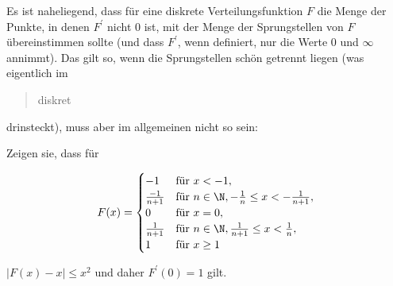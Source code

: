 
\begin{exercise}

Es ist naheliegend, dass für eine diskrete Verteilungsfunktion $F$ die Menge der Punkte, in denen $F^\prime$ nicht $0$ ist, mit der Menge der Sprungstellen von $F$ übereinstimmen sollte (und dass $F^\prime$, wenn definiert, nur die Werte $0$ und $\infty$ annimmt).
Das gilt so, wenn die Sprungstellen schön getrennt liegen (was eigentlich im \blockquote{diskret} drinsteckt), muss aber im allgemeinen nicht so sein:

Zeigen sie, dass für

\begin{align*}
    F(x)
    =
    \begin{cases}
        -1               & \text{für}~ x < -1,                                           \\
        \frac{-1}{n + 1} & \text{für}~ n \in \N, -\frac{1}{n} \leq x < -\frac{1}{n + 1}, \\
        0                & \text{für}~ x = 0,                                            \\
        \frac{1}{n + 1}  & \text{für}~ n \in \N, \frac{1}{n + 1} \leq x < \frac{1}{n},   \\
        1                & \text{für}~ x \geq 1
    \end{cases}
\end{align*}

$|F(x) - x| \leq x^2$ und daher $F^\prime(0) = 1$ gilt.

\end{exercise}


